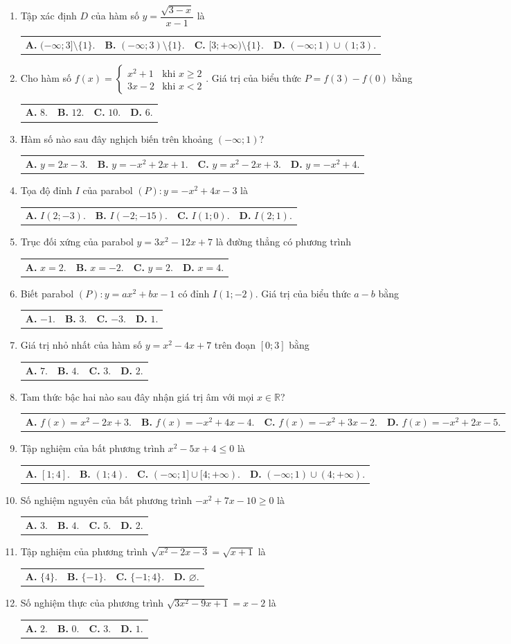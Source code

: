 \documentclass[10pt,a4paper]{article}
\makeatletter
\newcommand{\four}[4]{\par\noindent\begin{tabularx}{\linewidth}{@{}*{4}{>{\raggedright\arraybackslash}X}@{}}\textbf{A.} #1&\textbf{B.} #2&\textbf{C.} #3&\textbf{D.} #4\end{tabularx}}
\makeatother
\begin{document}
\begin{enumerate}
\item Tập xác định $D$ của hàm số $y = \dfrac{\sqrt{3 - x}}{x - 1}$ là
\four{$(-\infty; 3] \setminus \{1\}$.}{$(-\infty; 3) \setminus \{1\}$.}{$[3; +\infty) \setminus \{1\}$.}{$(-\infty; 1) \cup (1; 3)$.}

\item Cho hàm số $f(x) = \begin{cases} x^2 + 1 & \text{khi } x \ge 2 \\ 3x - 2 & \text{khi } x < 2 \end{cases}$. Giá trị của biểu thức $P = f(3) - f(0)$ bằng
\four{$8$.}{$12$.}{$10$.}{$6$.}

\item Hàm số nào sau đây nghịch biến trên khoảng $(-\infty; 1)$?
\four{$y = 2x - 3$.}{$y = -x^2 + 2x + 1$.}{$y = x^2 - 2x + 3$.}{$y = -x^2 + 4$.}

\item Tọa độ đỉnh $I$ của parabol $(P): y = -x^2 + 4x - 3$ là
\four{$I(2; -3)$.}{$I(-2; -15)$.}{$I(1; 0)$.}{$I(2; 1)$.}
\pagebreak

\item Trục đối xứng của parabol $y = 3x^2 - 12x + 7$ là đường thẳng có phương trình
\four{$x = 2$.}{$x = -2$.}{$y = 2$.}{$x = 4$.}

\item Biết parabol $(P): y = ax^2 + bx - 1$ có đỉnh $I(1; -2)$. Giá trị của biểu thức $a - b$ bằng
\four{$-1$.}{$3$.}{$-3$.}{$1$.}

\item Giá trị nhỏ nhất của hàm số $y = x^2 - 4x + 7$ trên đoạn $[0; 3]$ bằng
\four{$7$.}{$4$.}{$3$.}{$2$.}

\item Tam thức bậc hai nào sau đây nhận giá trị âm với mọi $x \in \mathbb{R}$?
\four{$f(x) = x^2 - 2x + 3$.}{$f(x) = -x^2 + 4x - 4$.}{$f(x) = -x^2 + 3x - 2$.}{$f(x) = -x^2 + 2x - 5$.}

\item Tập nghiệm của bất phương trình $x^2 - 5x + 4 \le 0$ là
\four{$[1; 4]$.}{$(1; 4)$.}{$(-\infty; 1] \cup [4; +\infty)$.}{$(-\infty; 1) \cup (4; +\infty)$.}

\item Số nghiệm nguyên của bất phương trình $-x^2 + 7x - 10 \ge 0$ là
\four{$3$.}{$4$.}{$5$.}{$2$.}

\item Tập nghiệm của phương trình $\sqrt{x^2 - 2x - 3} = \sqrt{x + 1}$ là
\four{$\{4\}$.}{$\{-1\}$.}{$\{-1; 4\}$.}{$\varnothing$.}

\item Số nghiệm thực của phương trình $\sqrt{3x^2 - 9x + 1} = x - 2$ là
\four{$2$.}{$0$.}{$3$.}{$1$.}
\end{enumerate}
\end{document}
